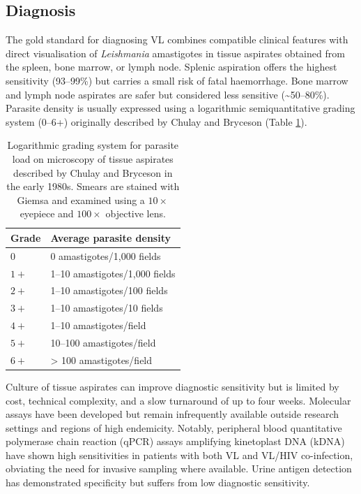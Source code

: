 \subsection{Diagnosis}

The gold standard for diagnosing VL combines compatible clinical features with direct visualisation of \textit{Leishmania} amastigotes in tissue aspirates obtained from the spleen, bone marrow, or lymph node. Splenic aspiration offers the highest sensitivity (93--99\%) but carries a small risk of fatal haemorrhage. Bone marrow and lymph node aspirates are safer but considered less sensitive (\textasciitilde50--80\%)\cite{farrar2023manson,burza2018}. Parasite density is usually expressed using a logarithmic semiquantitative grading system (0--6+) originally described by Chulay and Bryceson (Table \ref{tab:grading})\cite{chulay1983}.


\begin{table}[ht]
  \centering
  \caption{Logarithmic grading system for parasite load on microscopy of tissue aspirates described by Chulay and Bryceson in the early 1980s\cite{chulay1983}. Smears are stained with Giemsa and examined using a $10\times$ eyepiece and $100\times$ objective lens.}
  \begin{tabular}{ll}
    \toprule
    \textbf{Grade} & \textbf{Average parasite density} \\
    \midrule
    $0$            & 0 amastigotes/1,000 fields        \\
    $1+$           & 1--10 amastigotes/1,000 fields    \\
    $2+$           & 1--10 amastigotes/100 fields      \\
    $3+$           & 1--10 amastigotes/10 fields       \\
    $4+$           & 1--10 amastigotes/field           \\
    $5+$           & 10--100 amastigotes/field         \\
    $6+$           & > 100 amastigotes/field           \\
    \bottomrule
  \end{tabular}
  \label{tab:grading}
\end{table}

Culture of tissue aspirates can improve diagnostic sensitivity but is limited by cost, technical complexity, and a slow turnaround of up to four weeks. Molecular assays have been developed but remain infrequently available outside research settings and regions of high endemicity. Notably, peripheral blood quantitative polymerase chain reaction (qPCR) assays amplifying kinetoplast DNA (kDNA) have shown high sensitivities in patients with both VL and VL/HIV co-infection\cite{galluzzi2018, rihs2025, verrest2024}, obviating the need for invasive sampling where available. Urine antigen detection has demonstrated specificity but suffers from low diagnostic sensitivity\cite{vangriensven2018, riera2004}.

